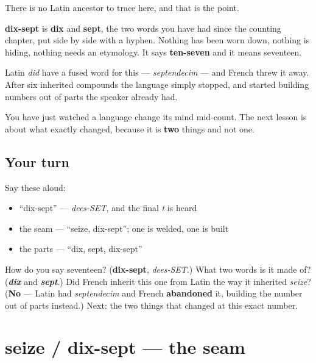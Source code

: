 \begin{cousinweb}
There is no Latin ancestor to trace here, and that is the point.

\textbf{dix-sept} is \textbf{dix} and \textbf{sept}, the two words you have had since the counting chapter, put side by side with a hyphen. Nothing has been worn down, nothing is hiding, nothing needs an etymology. It says \textbf{ten-seven} and it means seventeen.

Latin \emph{did} have a fused word for this — \emph{septendecim} — and French threw it away. After six inherited compounds the language simply stopped, and started building numbers out of parts the speaker already had.

You have just watched a language change its mind mid-count. The next lesson is about what exactly changed, because it is \textbf{two} things and not one.
\end{cousinweb}

\subsection*{Your turn}
Say these aloud:

\begin{itemize}
\raggedright
  \item \textquotedblleft{}dix-sept\textquotedblright{} — \emph{dees-SET}, and the final \emph{t} is heard
  \item the seam — \textquotedblleft{}seize, dix-sept\textquotedblright{}; one is welded, one is built
  \item the parts — \textquotedblleft{}dix, sept, dix-sept\textquotedblright{}
\end{itemize}

\begin{tcolorbox}[breakable,colback=teal!4,colframe=teal!35!black,title={Before you move on}]
How do you say seventeen? (\textbf{dix-sept}, \emph{dees-SET}.) What two words is it made of? (\emph{\textbf{dix}} and \emph{\textbf{sept}}.) Did French inherit this one from Latin the way it inherited \emph{seize}? (\textbf{No} — Latin had \emph{septendecim} and French \textbf{abandoned} it, building the number out of parts instead.) Next: the two things that changed at this exact number.
\end{tcolorbox}
\section[seize / dix-sept]{seize / dix-sept — the seam}

